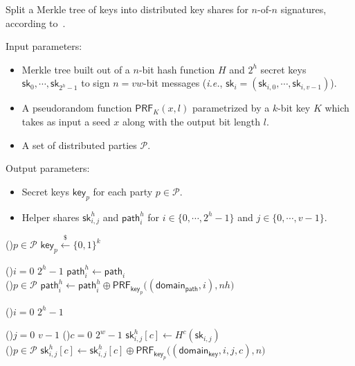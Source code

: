 \begin{algorithm}[htbp]
    \caption{Split a Merkle tree of \WOTS keys into distributed key shares for $n$-of-$n$ signatures, according to~\cite{cryptoeprint:2022/241}.}
    \begin{algostyle} %
Input parameters:
\vspace{-.75em}
\begin{itemize}
\itemsep-.5em
\item Merkle tree built out of a $n$-bit hash function $H$ and $2^h$ \WOTS secret keys $\mathsf{sk}_0,\cdots,\mathsf{sk}_{2^h-1}$ to sign $n=vw$-bit messages (\textit{i.e.}, $\mathsf{sk}_i = (\mathsf{sk}_{i,0}, \cdots, \mathsf{sk}_{i,v-1})$).
\item A pseudorandom function $\mathsf{PRF}_K(x,l)$ parametrized by a $k$-bit key $K$ which takes as input a seed $x$ along with the output bit length $l$.
\item A set of distributed parties $\mathcal{P}$.
\end{itemize}

Output parameters:
\vspace{-.75em}
\begin{itemize}
\itemsep-.5em
\item Secret keys $\mathsf{key}_p$ for each party $p \in \mathcal{P}$.
\item Helper shares $\mathsf{sk}^h_{i,j}$ and $\mathsf{path}^h_{i}$ for $i \in \{0,\cdots,2^h-1\}$ and $j \in \{0, \cdots, v-1\}$.
\end{itemize}

\ForEach(){$p \in \mathcal{P}$} {
	$\mathsf{key}_p \xleftarrow[]{\$} \{0,1\}^k $ 
}\vspace{1em}

\For(){$i=0$ \KwTo $2^h-1$} {
	$\mathsf{path}^h_i \leftarrow \mathsf{path}_i$\\
	\ForEach(){$p \in \mathcal{P}$} {
		$\mathsf{path}^h_i \leftarrow \mathsf{path}^h_i \oplus \mathsf{PRF}_{\mathsf{key}_p}\big((\mathsf{domain_{path}}, i), nh\big)$
	}
}\vspace{1em}
	
\For(){$i=0$ \KwTo $2^h-1$} {
	\For(){$j=0$ \KwTo $v-1$} {
		\For(){$c=0$ \KwTo $2^w-1$} {
		$\mathsf{sk}^h_{i,j}[c] \leftarrow H^c(\mathsf{sk}_{i,j})$ \\
		\ForEach(){$p \in \mathcal{P}$} {
			$\mathsf{sk}^h_{i,j}[c] \leftarrow \mathsf{sk}^h_{i,j}[c] \oplus \mathsf{PRF}_{\mathsf{key}_p}\big((\mathsf{domain_{key}}, i, j, c), n\big)$
			}
		}
	}

}
\label{alg:bool_split_n}
\end{algostyle}
\end{algorithm}

